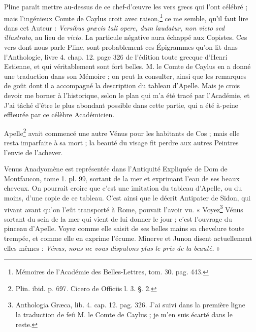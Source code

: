 \documentclass[a4paper, 11pt, oneside, polutonikogreek, french]{article}
\begin{document}
Pline paraît mettre au-dessus de ce chef-d'œuvre les vers grecs qui l'ont célébré ; mais l'ingénieux Comte de Caylus croit avec raison,\footnote{Mémoires de l'Académie des Belles-Lettres, tom. 30. pag. 443.} ce me semble, qu'il faut lire dans cet Auteur : \emph{Versibus græcis tali opere, dum laudatur, non victo sed illustrato}, au lieu de \emph{victo}. La particule négative aura échappé aux Copistes. Ces vers dont nous parle Pline, sont probablement ces Épigrammes qu'on lit dans l'Anthologie, livre 4. chap. 12. page 326 de l'édition toute grecque d'Henri Estienne, et qui véritablement sont fort belles. M. le Comte de Caylus en a donné une traduction dans son Mémoire ; on peut la consulter, ainsi que les remarques de goût dont il a accompagné la description du tableau d'Apelle. Mais je crois devoir me borner à l'historique, selon le plan qui m'a été tracé par l'Académie, et J'ai tâché d'être le plus abondant possible dans cette partie, qui a été à-peine effleurée par ce célèbre Académicien.

Apelle\footnote{Plin. ibid. p. 697. Cicero de Officiis l. 3. §. 2.} avait commencé une autre Vénus pour les habitants de Cos ; mais elle resta imparfaite à sa mort ; la beauté du visage fit perdre aux autres Peintres l'envie de l'achever.

Venus Anadyomène est représentée dans l'Antiquité Expliquée de Dom de Montfaucon, tome 1. pl. 99, sortant de la mer et exprimant l'eau de ses beaux cheveux. On pourrait croire que c'est une imitation du tableau d'Apelle, ou du moins, d'une copie de ce tableau. C'est ainsi que le décrit Antipater de Sidon, qui vivant avant qu'on l'eût transporté à Rome, pouvait l'avoir vu. « Voyez\footnote{Anthologia Græca, lib. 4. cap. 12. pag. 326. J'ai suivi dans la première ligne la traduction de feû M. le Comte de Caylus ; je m'en suis écarté dans le reste.} Vénus sortant du sein de la mer qui vient de lui donner le jour ; c'est l'ouvrage du pinceau d'Apelle. Voyez comme elle saisit de ses belles mains sa chevelure toute trempée, et comme elle en exprime l'écume. Minerve et Junon disent actuellement elles-mêmes : \emph{Vénus, nous ne vous disputons plus le prix de la beauté.} »
\end{document}
